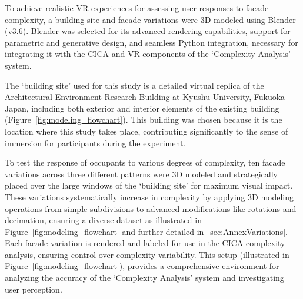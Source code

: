 %    



To achieve realistic VR experiences for assessing user responses to facade complexity, a building site and facade variations were 3D modeled using Blender (v3.6).
Blender was selected for its advanced rendering capabilities, support for parametric and generative design, and seamless Python integration, necessary for integrating it with the CICA and VR components of the `Complexity Analysis' system.

The `building site' used for this study is a detailed virtual replica of the Architectural Environment Research Building at Kyushu University, Fukuoka-Japan, including both exterior and interior elements of the existing building (Figure~\ref{fig:modeling_flowchart}). This building was chosen because it is the location where this study takes place, contributing significantly to the sense of immersion for participants during the experiment.

To test the response of occupants to various degrees of complexity, ten facade variations across three different patterns were 3D modeled and strategically placed over the large windows of the `building site' for maximum visual impact.
These variations systematically increase in complexity by applying 3D modeling operations from simple subdivisions to advanced modifications like rotations and decimation, ensuring a diverse dataset as illustrated in Figure~\ref{fig:modeling_flowchart} and further detailed in~\ref{sec:AnnexVariations}.
Each facade variation is rendered and labeled for use in the CICA complexity analysis, ensuring control over complexity variability.
This setup (illustrated in Figure~\ref{fig:modeling_flowchart}), provides a comprehensive environment for analyzing the accuracy of the `Complexity Analysis' system and investigating user perception.


